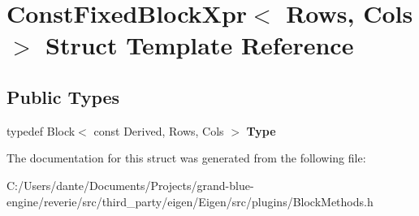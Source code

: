 \hypertarget{struct_const_fixed_block_xpr}{}\section{Const\+Fixed\+Block\+Xpr$<$ Rows, Cols $>$ Struct Template Reference}
\label{struct_const_fixed_block_xpr}
\subsection*{Public Types}
\begin{DoxyCompactItemize}
\item 
\mbox{\label{struct_const_fixed_block_xpr_aeef0c276ee139539e33171ef3ce64f92}} 
typedef Block$<$ const Derived, Rows, Cols $>$ {\bfseries Type}
\end{DoxyCompactItemize}


The documentation for this struct was generated from the following file\+:\begin{DoxyCompactItemize}
\item 
C\+:/\+Users/dante/\+Documents/\+Projects/grand-\/blue-\/engine/reverie/src/third\+\_\+party/eigen/\+Eigen/src/plugins/Block\+Methods.\+h\end{DoxyCompactItemize}
